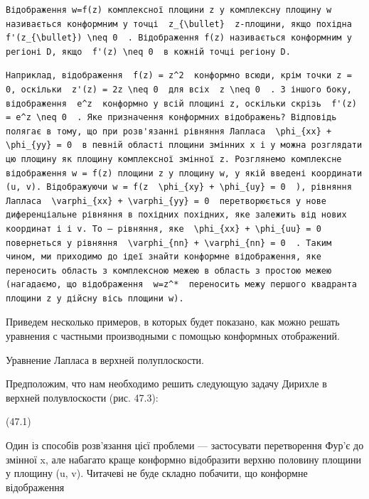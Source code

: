 \documentclass[
  ukrainian,
]{article}
\begin{document}
\begin{verbatim}
Відображення w=f(z) комплексної площини z у комплексну площину w називається конформним у точці  z_{\bullet}  z-площини, якщо похідна  f'(z_{\bullet}) \neq 0  . Відображення f(z) називається конформним у регіоні D, якщо  f'(z) \neq 0  в кожній точці регіону D.
\end{verbatim}

\begin{verbatim}
Наприклад, відображення  f(z) = z^2  конформно всюди, крім точки z = 0, оскільки  z'(z) = 2z \neq 0  для всіх  z \neq 0  . З іншого боку, відображення  e^z  конформно у всій площині z, оскільки скрізь  f'(z) = e^z \neq 0  . Яке призначення конформних відображень? Відповідь полягає в тому, що при розв'язанні рівняння Лапласа  \phi_{xx} + \phi_{yy} = 0  в певній області площини змінних x і y можна розглядати цю площину як площину комплексної змінної z. Розглянемо комплексне відображення w = f(z) площини z у площину w, у якій введені координати (u, v). Відображуючи w = f(z  \phi_{xy} + \phi_{uy} = 0  ), рівняння Лапласа  \varphi_{xx} + \varphi_{yy} = 0  перетворюється у нове диференціальне рівняння в похідних похідних, яке залежить від нових координат і і v. To — рівняння, яке  \phi_{xx} + \phi_{uu} = 0  повернеться у рівняння  \varphi_{nn} + \varphi_{nn} = 0  . Таким чином, ми приходимо до ідеї знайти конформне відображення, яке переносить область з комплексною межею в область з простою межею (нагадаємо, що відображення  w=z^*  переносить межу першого квадранта площини z у дійсну вісь площини w).
\end{verbatim}

Приведем несколько примеров, в которых будет показано, как можно решать
уравнения с частными производными с помощью конформных отображений.

Уравнение Лапласа в верхней полуплоскости.

Предположим, что нам необходимо решить следующую задачу Дирихле в
верхней полувлоскости (рис. 47.3):

(47.1)

Один із способів розв'язання цієї проблеми --- застосувати перетворення
Фур'є до змінної x, але набагато краще конформно відобразити верхню
половину площини у площину (u, v). Читачеві не буде складно побачити, що
конформне відображення
\end{document}
